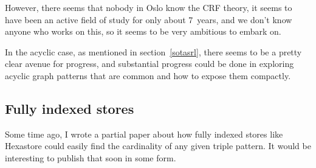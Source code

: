 However, there seems that nobody in Oslo know the CRF theory, it seems
to have been an active field of study for only about 7~years, and we don't
know anyone who works on this, so it seems to be very ambitious to
embark on. 

In the acyclic case, as mentioned in section~\ref{sotasrl}, there
seems to be a pretty clear avenue for progress, and substantial
progress could be done in exploring acyclic graph patterns that are
common and how to expose them compactly.


\subsection{Fully indexed stores}

Some time ago, I wrote a partial paper about how fully indexed stores
like Hexastore \cite{hexastore} could easily find the cardinality of
any given triple pattern. It would be interesting to publish that soon
in some form.
